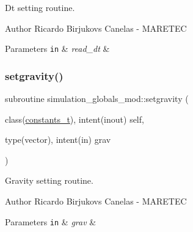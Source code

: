 Dt setting routine. 

\begin{DoxyAuthor}{Author}
Ricardo Birjukovs Canelas -\/ M\+A\+R\+E\+T\+EC 
\end{DoxyAuthor}

\begin{DoxyParams}[1]{Parameters}
\mbox{\tt in}  & {\em read\+\_\+dt} & \\
\hline
\end{DoxyParams}
\mbox{\label{namespacesimulation__globals__mod_a9e92dfed4ef7388208adce768f064554}} 
\subsubsection{\texorpdfstring{setgravity()}{setgravity()}}
{\footnotesize\ttfamily subroutine simulation\+\_\+globals\+\_\+mod\+::setgravity (\begin{DoxyParamCaption}\item[{class(\hyperlink{structsimulation__globals__mod_1_1constants__t}{constants\+\_\+t}), intent(inout)}]{self,  }\item[{type(vector), intent(in)}]{grav }\end{DoxyParamCaption})\hspace{0.3cm}{\ttfamily [private]}}



Gravity setting routine. 

\begin{DoxyAuthor}{Author}
Ricardo Birjukovs Canelas -\/ M\+A\+R\+E\+T\+EC 
\end{DoxyAuthor}

\begin{DoxyParams}[1]{Parameters}
\mbox{\tt in}  & {\em grav} & \\
\hline
\end{DoxyParams}
\mbox{\label{namespacesimulation__globals__mod_a8a05831d4c3e3eb5741d65978f6fcf61}} 
